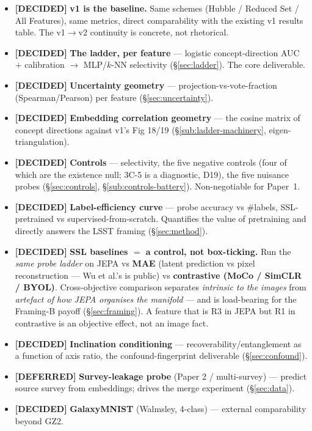 \documentclass[11pt,a4paper]{article}
\newcommand{\dec}{\textcolor{decided}{\sffamily\bfseries[DECIDED]}}
\newcommand{\dfr}{\textcolor{deferred}{\sffamily\bfseries[DEFERRED]}}
\begin{document}
\begin{itemize}[leftmargin=1.4em,itemsep=3pt]
\item \dec{} \textbf{v1 is the baseline.} Same schemes (Hubble / Reduced Set / All Features),
same metrics, direct comparability with the existing v1 results table. The v1$\rightarrow$v2
continuity is concrete, not rhetorical.
\item \dec{} \textbf{The ladder, per feature} --- logistic concept-direction AUC $+$ calibration
$\rightarrow$ MLP/$k$-NN selectivity (\S\ref{sec:ladder}). The core deliverable.
\item \dec{} \textbf{Uncertainty geometry} --- projection-vs-vote-fraction (Spearman/Pearson)
per feature (\S\ref{sec:uncertainty}).
\item \dec{} \textbf{Embedding correlation geometry} --- the cosine matrix of concept directions
against v1's Fig 18/19 (\S\ref{sub:ladder-machinery}, eigen-triangulation).
\item \dec{} \textbf{Controls} --- selectivity, the five negative controls (four of which are
the existence null; 3C-5 is a diagnostic, D19), the five nuisance probes (\S\ref{sec:controls},
\S\ref{sub:controls-battery}). Non-negotiable for Paper~1.
\item \dec{} \textbf{Label-efficiency curve} --- probe accuracy vs \#labels, SSL-pretrained vs
supervised-from-scratch. Quantifies the value of pretraining and directly answers the LSST
framing (\S\ref{sec:method}).
\item \dec{} \textbf{SSL baselines $=$ a control, not box-ticking.} Run the \emph{same probe
ladder} on JEPA vs \textbf{MAE} (latent prediction vs pixel reconstruction --- Wu et al.'s is
public) vs \textbf{contrastive (MoCo / SimCLR / BYOL)}. Cross-objective comparison separates
\emph{intrinsic to the images} from \emph{artefact of how JEPA organises the manifold} --- and is
load-bearing for the Framing-B payoff (\S\ref{sec:framing}). A feature that is R3 in JEPA but R1
in contrastive is an objective effect, not an image fact.
\item \dec{} \textbf{Inclination conditioning} --- recoverability/entanglement as a function of
axis ratio, the confound-fingerprint deliverable (\S\ref{sec:confound}).
\item \dfr{} \textbf{Survey-leakage probe} (Paper 2 / multi-survey) --- predict source survey
from embeddings; drives the merge experiment (\S\ref{sec:data}).
\item \dec{} \textbf{GalaxyMNIST} (Walmsley, 4-class) --- external comparability beyond GZ2.
\end{itemize}
\end{document}
